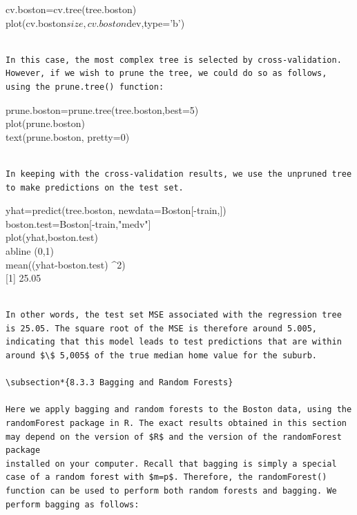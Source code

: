\documentclass[10pt]{article}
\begin{document}
\begin{displayquote}
cv.boston=cv.tree(tree.boston)\\
plot(cv.boston$size,cv.boston$dev,type='b')
\end{displayquote}

\begin{verbatim}

In this case, the most complex tree is selected by cross-validation. However, if we wish to prune the tree, we could do so as follows, using the prune.tree() function:
\end{verbatim}

\begin{displayquote}
prune.boston=prune.tree(tree.boston,best=5)\\
plot(prune.boston)\\
text(prune.boston, pretty=0)
\end{displayquote}

\begin{verbatim}

In keeping with the cross-validation results, we use the unpruned tree to make predictions on the test set.
\end{verbatim}

\begin{displayquote}
yhat=predict(tree.boston, newdata=Boston[-train,])\\[0pt]
boston.test=Boston[-train,"medv"]\\
plot(yhat,boston.test)\\
abline (0,1)\\
mean((yhat-boston.test) \^{}2)\\[0pt]
[1] 25.05
\end{displayquote}

\begin{verbatim}

In other words, the test set MSE associated with the regression tree is 25.05. The square root of the MSE is therefore around 5.005, indicating that this model leads to test predictions that are within around $\$ 5,005$ of the true median home value for the suburb.

\subsection*{8.3.3 Bagging and Random Forests}

Here we apply bagging and random forests to the Boston data, using the randomForest package in R. The exact results obtained in this section may depend on the version of $R$ and the version of the randomForest package
installed on your computer. Recall that bagging is simply a special case of a random forest with $m=p$. Therefore, the randomForest() function can be used to perform both random forests and bagging. We perform bagging as follows:
\end{verbatim}
\end{document}
